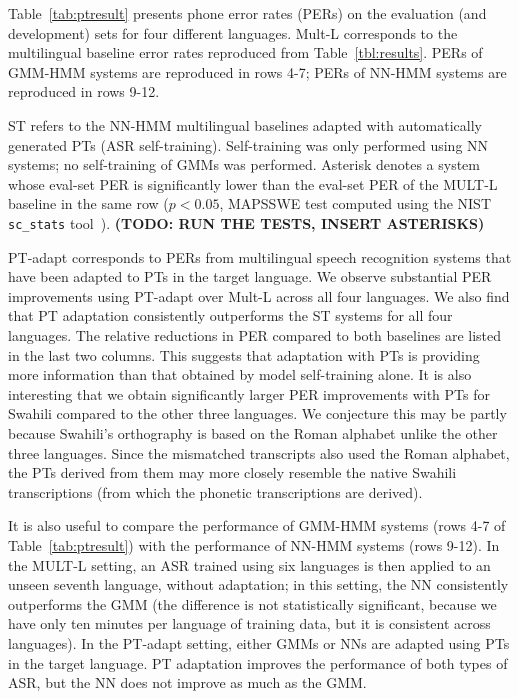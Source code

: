 Table~\ref{tab:ptresult} presents phone error rates (PERs) on the
evaluation (and development) sets for four different languages. {\sc
  Mult-L} corresponds to the multilingual baseline error rates
reproduced from Table~\ref{tbl:results}.  PERs of GMM-HMM systems are
reproduced in rows 4-7; PERs of NN-HMM systems are reproduced in rows
9-12.

{\sc ST} refers to the NN-HMM multilingual baselines adapted with
automatically generated PTs (ASR self-training). Self-training was
only performed using NN systems; no self-training of GMMs was
performed.  Asterisk denotes a system whose eval-set PER is
significantly lower than the eval-set PER of the MULT-L baseline in
the same row ($p<0.05$, MAPSSWE test computed using the NIST {\tt
  sc\_stats} tool~\cite{Pallet90}).  {\bf (TODO: RUN THE TESTS, INSERT
  ASTERISKS)}

{\sc PT-adapt} corresponds to PERs from multilingual speech
recognition systems that have been adapted to PTs in the target
language. We observe substantial PER improvements using {\sc PT-adapt}
over {\sc Mult-L} across all four languages. We also find that PT
adaptation consistently outperforms the {\sc ST} systems for all four
languages. The relative reductions in PER compared to both baselines
are listed in the last two columns.  This suggests that
adaptation with PTs is providing more information than that obtained
by model self-training alone. It is also interesting that we obtain
significantly larger PER improvements with PTs for Swahili compared to
the other three languages. We conjecture this may be partly because
Swahili's orthography is based on the Roman alphabet unlike the other
three languages. Since the mismatched transcripts also used the Roman
alphabet, the PTs derived from them may more closely resemble the
native Swahili transcriptions (from which the phonetic transcriptions
are derived).

It is also useful to compare the performance of GMM-HMM systems (rows
4-7 of Table~\ref{tab:ptresult}) with the performance of NN-HMM
systems (rows 9-12).  In the {\sc MULT-L} setting, an ASR trained
using six languages is then applied to an unseen seventh language,
without adaptation; in this setting, the NN consistently outperforms
the GMM (the difference is not statistically significant, because we
have only ten minutes per language of training data, but it is
consistent across languages).  In the {\sc PT-adapt} setting, either
GMMs or NNs are adapted using PTs in the target language.  PT
adaptation improves the performance of both types of ASR, but the NN
does not improve as much as the GMM.

